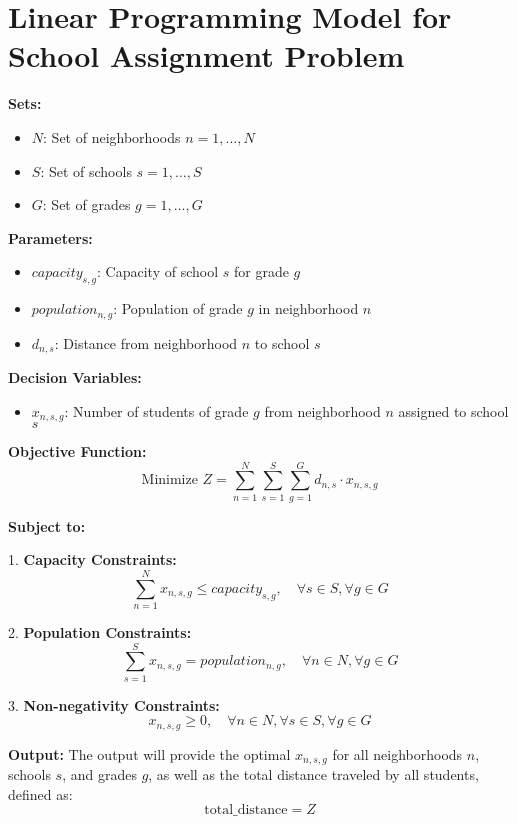 \documentclass{article}
\begin{document}
\section*{Linear Programming Model for School Assignment Problem}

\textbf{Sets:}
\begin{itemize}
    \item \( N \): Set of neighborhoods \( n = 1, \ldots, N \)
    \item \( S \): Set of schools \( s = 1, \ldots, S \)
    \item \( G \): Set of grades \( g = 1, \ldots, G \)
\end{itemize}

\textbf{Parameters:}
\begin{itemize}
    \item \( capacity_{s,g} \): Capacity of school \( s \) for grade \( g \)
    \item \( population_{n,g} \): Population of grade \( g \) in neighborhood \( n \)
    \item \( d_{n,s} \): Distance from neighborhood \( n \) to school \( s \)
\end{itemize}

\textbf{Decision Variables:}
\begin{itemize}
    \item \( x_{n,s,g} \): Number of students of grade \( g \) from neighborhood \( n \) assigned to school \( s \)
\end{itemize}

\textbf{Objective Function:}
\[
\text{Minimize } Z = \sum_{n=1}^{N} \sum_{s=1}^{S} \sum_{g=1}^{G} d_{n,s} \cdot x_{n,s,g}
\]

\textbf{Subject to:}

1. \textbf{Capacity Constraints:}
\[
\sum_{n=1}^{N} x_{n,s,g} \leq capacity_{s,g}, \quad \forall s \in S, \forall g \in G
\]

2. \textbf{Population Constraints:}
\[
\sum_{s=1}^{S} x_{n,s,g} = population_{n,g}, \quad \forall n \in N, \forall g \in G
\]

3. \textbf{Non-negativity Constraints:}
\[
x_{n,s,g} \geq 0, \quad \forall n \in N, \forall s \in S, \forall g \in G
\]

\textbf{Output:}
The output will provide the optimal \( x_{n,s,g} \) for all neighborhoods \( n \), schools \( s \), and grades \( g \), as well as the total distance traveled by all students, defined as:
\[
\text{total\_distance} = Z
\]
\end{document}

